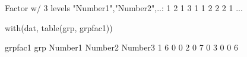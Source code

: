 \begin{Schunk}
\begin{Soutput}
 Factor w/ 3 levels "Number1","Number2",..: 1 2 1 3 1 1 2 2 2 1 ...
\end{Soutput}
\begin{Sinput}
  with(dat, table(grp, grpfac1))
\end{Sinput}
\begin{Soutput}
   grpfac1
grp Number1 Number2 Number3
  1       6       0       0
  2       0       7       0
  3       0       0       6
\end{Soutput}
\end{Schunk}
